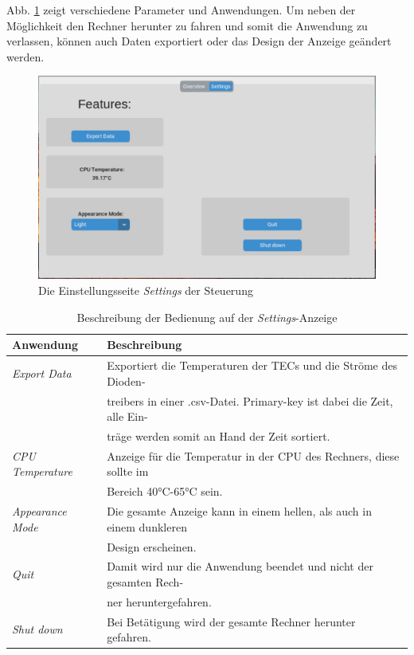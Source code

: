 Abb. \ref{fig:settings_sw} zeigt verschiedene Parameter und Anwendungen. Um neben der Möglichkeit den Rechner herunter zu fahren und somit die Anwendung zu verlassen, können auch Daten exportiert oder das Design der Anzeige geändert werden.

\begin{figure}[H]
    \centering
    \includegraphics[scale=0.3, trim={1mm 1mm 1mm 2mm}, clip]{98_images/window_settings_large_02.PNG}
    \caption{Die Einstellungsseite \textit{Settings} der Steuerung}
    \label{fig:settings_sw}
\end{figure}

\begin{table}[H]
    \centering
    \begin{tabular}{l|l}
         \textbf{Anwendung}&        \textbf{Beschreibung}\\
         \hline
         \textit{Export Data}&      Exportiert die Temperaturen der TECs und die Ströme des Dioden-\\
         &                          treibers in einer .csv-Datei. Primary-key ist dabei die Zeit, alle Ein-\\
         &                          träge werden somit an Hand der Zeit sortiert.\\
         \textit{CPU Temperature}&  Anzeige für die Temperatur in der CPU des Rechners, diese sollte im\\
         &                          Bereich 40°C-65°C sein.\\
         \textit{Appearance Mode}&  Die gesamte Anzeige kann in einem hellen, als auch in einem dunkleren\\
         &                          Design erscheinen.\\
         \textit{Quit}&             Damit wird nur die Anwendung beendet und nicht der gesamten Rech-\\
         &                          ner heruntergefahren.\\
         \textit{Shut down}&        Bei Betätigung wird der gesamte Rechner herunter gefahren.
    \end{tabular}
    \caption{Beschreibung der Bedienung auf der \textit{Settings}-Anzeige}
    \label{tab:settings_beschriebung_sw}
\end{table}

